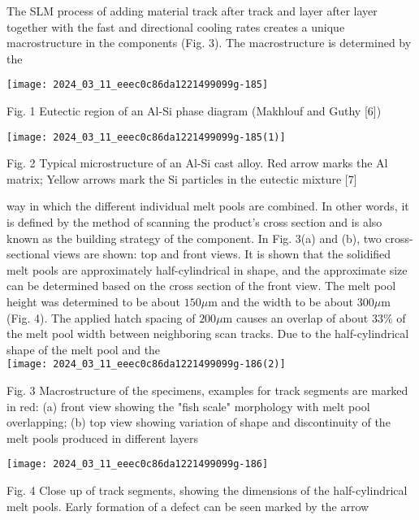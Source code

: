 \documentclass[10pt]{article}
\begin{document}
The SLM process of adding material track after track and layer after layer together with the fast and directional cooling rates creates a unique macrostructure in the components (Fig. 3). The macrostructure is determined by the

\begin{center}
\texttt{[image: 2024\_03\_11\_eeec0c86da1221499099g-185]}
\end{center}

Fig. 1 Eutectic region of an Al-Si phase diagram (Makhlouf and Guthy [6])

\begin{center}
\texttt{[image: 2024\_03\_11\_eeec0c86da1221499099g-185(1)]}
\end{center}

Fig. 2 Typical microstructure of an Al-Si cast alloy. Red arrow marks the Al matrix; Yellow arrows mark the Si particles in the eutectic mixture [7]

way in which the different individual melt pools are combined. In other words, it is defined by the method of scanning the product's cross section and is also known as the building strategy of the component. In Fig. 3(a) and (b), two cross-sectional views are shown: top and front views. It is shown that the solidified melt pools are approximately half-cylindrical in shape, and the approximate size can be determined based on the cross section of the front view. The melt pool height was determined to be about $150 \mu \mathrm{m}$ and the width to be about $300 \mu \mathrm{m}$ (Fig. 4). The applied hatch spacing of $200 \mu \mathrm{m}$ causes an overlap of about $33 \%$ of the melt pool width between neighboring scan tracks. Due to the half-cylindrical shape of the melt pool and the\\
\texttt{[image: 2024\_03\_11\_eeec0c86da1221499099g-186(2)]}

Fig. 3 Macrostructure of the specimens, examples for track segments are marked in red: (a) front view showing the "fish scale" morphology with melt pool overlapping; (b) top view showing variation of shape and discontinuity of the melt pools produced in different layers

\begin{center}
\texttt{[image: 2024\_03\_11\_eeec0c86da1221499099g-186]}
\end{center}

Fig. 4 Close up of track segments, showing the dimensions of the half-cylindrical melt pools. Early formation of a defect can be seen marked by the arrow
\end{document}
